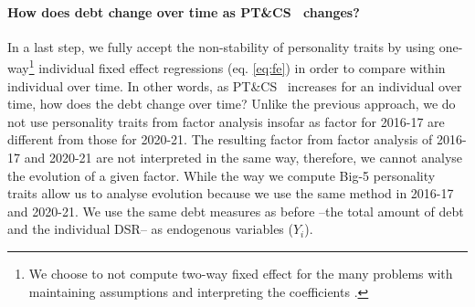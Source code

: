 \documentclass[a4paper, 11pt, onecolumn]{article}
\newcommand{\PTCS}{PT\&CS}
\begin{document}



\paragraph{How does debt change over time as \PTCS~ changes?}
In a last step, we fully accept the non-stability of personality traits by using one-way\footnote{We choose to not compute two-way fixed effect for the many problems with maintaining assumptions and interpreting the coefficients \citep{Kropko2020,Imai2020}.} individual fixed effect regressions (eq. \ref{eq:fe}) in order to compare within individual over time.
In other words, as \PTCS~ increases for an individual over time, how does the debt change over time?
Unlike the previous approach, we do not use personality traits from factor analysis insofar as factor for 2016-17 are different from those for 2020-21.
The resulting factor from factor analysis of 2016-17 and 2020-21 are not interpreted in the same way, therefore, we cannot analyse the evolution of a given factor.
While the way we compute Big-5 personality traits allow us to analyse evolution because we use the same method in 2016-17 and 2020-21.
We use the same debt measures as before --the total amount of debt and the individual DSR-- as endogenous variables ($Y_{i}$). 
\end{document}
